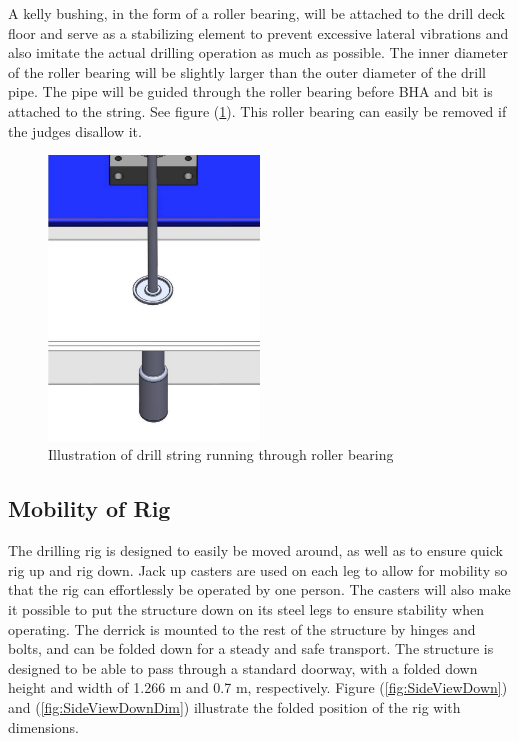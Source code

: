 A kelly bushing, in the form of a roller bearing, will be attached to the drill deck floor and serve as a stabilizing element to prevent excessive lateral vibrations and also imitate the actual drilling operation as much as possible. The inner diameter of the roller bearing will be slightly larger than the outer diameter of the drill pipe. The pipe will be guided through the roller bearing before BHA and bit is attached to the string. See figure (\ref{fig:Roller}). This roller bearing can easily be removed if the judges disallow it. 

\begin{figure} [H]
\centering
\includegraphics[width=0.5\textwidth]{figures/Roller.jpg}
\caption{Illustration of drill string running through roller bearing}
\label{fig:Roller}
\end{figure}

\subsection{Mobility of Rig}
The drilling rig is designed to easily be moved around, as well as to ensure quick rig up and rig down. Jack up casters are used on each leg to allow for mobility so that the rig can effortlessly be operated by one person. The casters will also make it possible to put the structure down on its steel legs to ensure stability when operating. The derrick is mounted to the rest of the structure by hinges and bolts, and can be folded down for a steady and safe transport. The structure is designed to be able to pass through a standard doorway, with a folded down height and width of 1.266 m and 0.7 m, respectively. Figure (\ref{fig:SideViewDown}) and (\ref{fig:SideViewDownDim}) illustrate the folded position of the rig with dimensions. 

